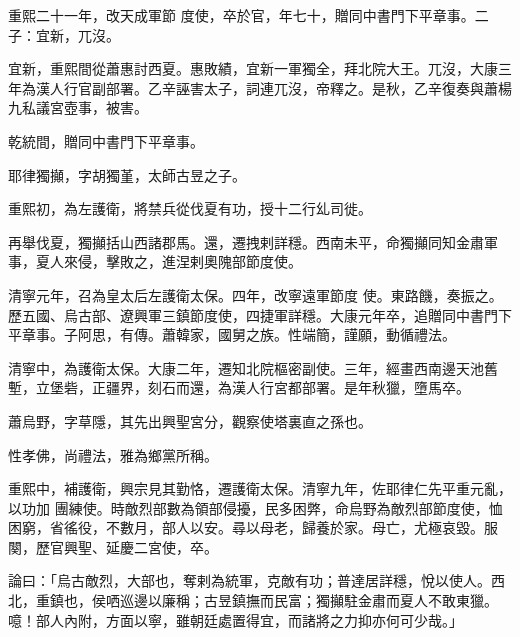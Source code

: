 \begin{pinyinscope}
 重熙二十一年，改天成軍節
 度使，卒於官，年七十，贈同中書門下平章事。二子：宜新，兀沒。



 宜新，重熙間從蕭惠討西夏。惠敗績，宜新一軍獨全，拜北院大王。兀沒，大康三年為漢人行官副部署。乙辛誣害太子，詞連兀沒，帝釋之。是秋，乙辛復奏與蕭楊九私議宮壺事，被害。



 乾統間，贈同中書門下平章事。



 耶律獨攧，字胡獨堇，太師古昱之子。



 重熙初，為左護衛，將禁兵從伐夏有功，授十二行乣司徙。



 再舉伐夏，獨攧括山西諸郡馬。還，遷拽剌詳穩。西南未平，命獨攧同知金肅軍事，夏人來侵，擊敗之，進涅剌奧隗部節度使。



 清寧元年，召為皇太后左護衛太保。四年，改寧遠軍節度
 使。東路饑，奏振之。歷五國、烏古部、遼興軍三鎮節度使，四捷軍詳穩。大康元年卒，追贈同中書門下平章事。子阿思，有傳。蕭韓家，國舅之族。性端簡，謹願，動循禮法。



 清寧中，為護衛太保。大康二年，遷知北院樞密副使。三年，經畫西南邊天池舊塹，立堡砦，正疆界，刻石而還，為漢人行宮都部署。是年秋獵，墮馬卒。



 蕭烏野，字草隱，其先出興聖宮分，觀察使塔裏直之孫也。



 性孝佛，尚禮法，雅為鄉黨所稱。



 重熙中，補護衛，興宗見其勤恪，遷護衛太保。清寧九年，佐耶律仁先平重元亂，以功加
 團練使。時敵烈部數為領部侵擾，民多困弊，命烏野為敵烈部節度使，恤困窮，省徭役，不數月，部人以安。尋以母老，歸養於家。母亡，尤極哀毀。服闋，歷官興聖、延慶二宮使，卒。



 論曰：「烏古敵烈，大部也，奪剌為統軍，克敵有功；普達居詳穩，悅以使人。西北，重鎮也，侯哂巡邊以廉稱；古昱鎮撫而民富；獨攧駐金肅而夏人不敢東獵。噫！部人內附，方面以寧，雖朝廷處置得宜，而諸將之力抑亦何可少哉。」



\end{pinyinscope}